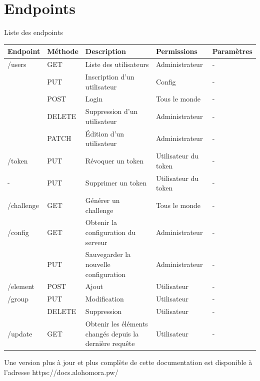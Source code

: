 \documentclass[oneside]{report}
\begin{document}
	\section{Endpoints}{
		\par Liste des endpoints
		\par\vspace{.5cm}
		\begin{tabu} to \textwidth {|X[2]|X[1]|X[3]|X[2]|X|}
			\hline
			Endpoint & Méthode & Description & Permissions & Paramètres \\
			\hline
			/users & GET & Liste des utilisateurs & Administrateur & - \\
			& PUT & Inscription d'un utilisateur & Config & - \\
			& POST & Login & Tous le monde & - \\
			& DELETE & Suppression d'un utilisateur & Administrateur & - \\
			& PATCH & Édition d'un utilisateur & Administrateur & - \\
			\hline
			/token & PUT & Révoquer un token & Utilisateur du token & - \\
			- & PUT & Supprimer un token & Utilisateur du token & - \\
			\hline
			/challenge & GET & Générer un challenge & Tous le monde & - \\
			\hline
			/config & GET & Obtenir la configuration du serveur & Administrateur & - \\
			& PUT & Sauvegarder la nouvelle configuration & Administrateur & - \\
			\hline
			/element & POST & Ajout & Utilisateur & -\\
			/group & PUT & Modification & Utilisateur & -\\
			& DELETE & Suppression & Utilisateur & -\\
			\hline
			/update & GET & Obtenir les éléments changés depuis la dernière requête & Utilisateur & - \\
			\hline
		\end{tabu}

		\par Une version plus à jour et plus complète de cette documentation est disponible à l'adresse https://docs.alohomora.pw/
	}
\end{document}
